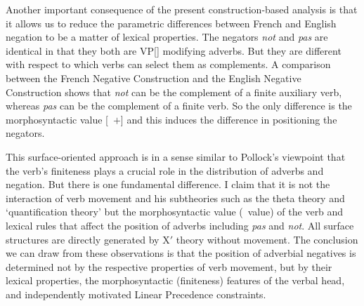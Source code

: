 \documentclass[output=paper]{langsci/langscibook}
\begin{document}
\be
\ex \begin{xlist}
\end{xlist}
\ee

\be
\ex \begin{xlist}
\end{xlist}
\ee

\be
\ex \begin{xlist}
\end{xlist}
\ee

\be
\ex \begin{xlist}
\end{xlist}
\ee


Another important consequence of the present construction-based analysis
is that it allows us to reduce the parametric differences between
French and English negation to be a matter of lexical properties.
The negators \emph{not} and \emph{pas} are identical in that they both are
VP[] modifying adverbs. But they are different with respect to
which verbs can select them as complements.
A comparison between the French Negative Construction and
the English  Negative Construction shows that \emph{not} can be the
complement of a finite auxiliary verb, whereas \emph{pas} can be the
complement of a finite verb.  So the only difference
is the morphosyntactic value [\AUX\ $+$] and this induces
the difference in positioning the negators.

This surface-oriented approach is in a sense similar to
Pollock's viewpoint that the verb's finiteness plays a
crucial role in the distribution of adverbs and negation. But
there is one fundamental difference. I claim that it is not the interaction
of verb movement and his subtheories  such as the theta theory
and `quantification theory'  but the morphosyntactic value (\VFORM\
value) of the verb and lexical rules that affect the position of
adverbs including \emph{pas} and {\it not}. All surface structures are directly
generated by X$'$ theory without movement. The conclusion we can draw from these observations
is that the position of adverbial negatives is determined not by
the respective
properties of verb movement, but by their lexical
properties, the morphosyntactic (finiteness) features of the verbal head,
and independently motivated Linear Precedence constraints.
\end{document}
